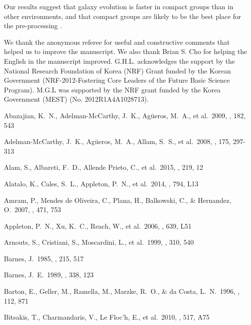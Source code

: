 \documentclass[12pt,preprint,apj]{emulateapj}
\begin{document}
Our results suggest that galaxy evolution is faster in compact groups than 
in other environments, and that compact groups are likely to be the best 
place for the pre-processing \citep{zabludoff98}.


\acknowledgments
We thank the anonymous referee for useful and constructive comments 
that helped us to improve the manuscript.
We also thank Brian S. Cho for helping the English in the manuscript improved.
G.H.L. acknowledges the support by the National Research Foundation of Korea (NRF) Grant funded 
by the Korean Government (NRF-2012-Fostering Core Leaders of the Future Basic Science Program).
M.G.L was supported by the NRF grant funded by the Korea Government (MEST) (No. 2012R1A4A1028713).


\begin{thebibliography}{}

 Abazajian, K.~N., 
Adelman-McCarthy, J.~K., Ag{\"u}eros, M.~A., et al.\ 2009, \apjs, 182, 
543

 Adelman-McCarthy, J.~K., Ag{\"u}eros, M.~A., Allam, S.~S., et al.\ 2008, \apjs, 175, 297-313 

 Alam, S., Albareti, F.~D., 
Allende Prieto, C., et al.\ 2015, \apjs, 219, 12 

 Alatalo, K., Cales, 
S.~L., Appleton, P.~N., et al.\ 2014, \apjl, 794, L13

 Amram, P., Mendes de Oliveira, C., Plana, H., Balkowski, C., \& Hernandez, O.\ 2007, \aap, 471, 753

 Appleton, P.~N., Xu, K.~C., Reach, W., et al.\ 2006, \apjl, 639, L51 

 Arnouts, S., Cristiani, S., Moscardini, L., et al.\ 1999, \mnras, 310, 540 

 Barnes, J.\ 1985, \mnras, 215, 517

 Barnes, J.~E.\ 1989, \nat, 338, 123 

 Barton, E., Geller, M., 
Ramella, M., Marzke, R.~O., \& da Costa, L.~N.\ 1996, \aj, 112, 871 

 Bitsakis, T., Charmandaris, V., Le Floc'h, E., et al.\ 2010, \aap, 517, A75 


\end{thebibliography}
\end{document}
